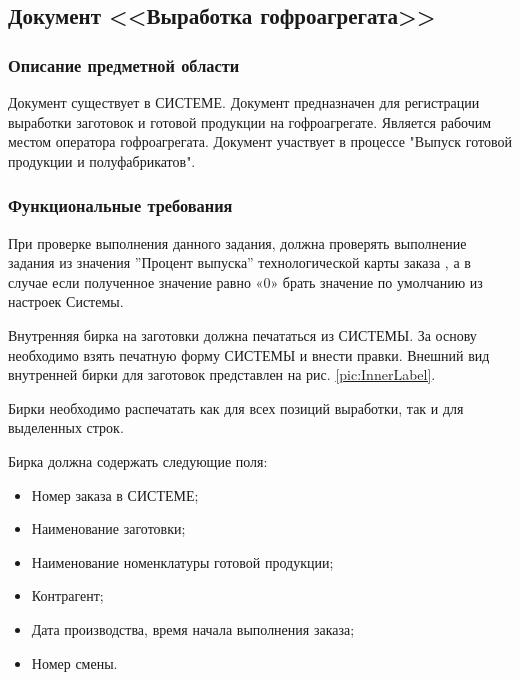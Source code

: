 \subsection{Документ <<Выработка гофроагрегата>>}
\label{doc:corrugatorproduction}



\subsubsection{Описание предметной области}

Документ существует в СИСТЕМЕ.
Документ предназначен для регистрации выработки заготовок и готовой продукции на гофроагрегате. Является рабочим местом оператора гофроагрегата.
Документ участвует в процессе "Выпуск готовой продукции и полуфабрикатов".



 \subsubsection{Функциональные требования}



При проверке выполнения данного задания, должна проверять  выполнение задания из значения ''Процент выпуска'' технологической карты заказа , а в случае если полученное значение равно «0» брать значение по умолчанию из настроек Системы.



Внутренняя бирка на заготовки должна печататься из СИСТЕМЫ.
За основу необходимо взять печатную форму СИСТЕМЫ и внести правки.
Внешний вид внутренней бирки для заготовок представлен на рис. \ref{pic:InnerLabel}.

Бирки необходимо распечатать как для всех позиций выработки, так и для выделенных строк.

Бирка должна содержать следующие поля:
\begin{itemize}
    \item Номер заказа в СИСТЕМЕ;
    \item Наименование заготовки;
    \item Наименование номенклатуры готовой продукции;
    \item Контрагент;
    \item Дата производства, время начала выполнения заказа;
    \item Номер смены.
\end{itemize}

